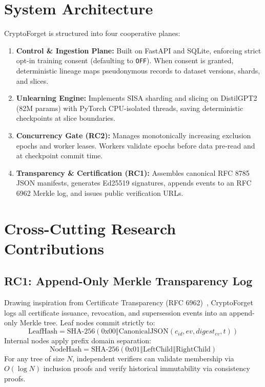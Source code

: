 \documentclass[10pt,journal,compsoc]{IEEEtran}
\begin{document}
\section{System Architecture}
CryptoForget is structured into four cooperative planes:
\begin{enumerate}
    \item \textbf{Control \& Ingestion Plane:} Built on FastAPI and SQLite, enforcing strict opt-in training consent (defaulting to \texttt{OFF}). When consent is granted, deterministic lineage maps pseudonymous records to dataset versions, shards, and slices.
    \item \textbf{Unlearning Engine:} Implements SISA sharding and slicing on DistilGPT2 (82M params) with PyTorch CPU-isolated threads, saving deterministic checkpoints at slice boundaries.
    \item \textbf{Concurrency Gate (RC2):} Manages monotonically increasing exclusion epochs and worker leases. Workers validate epochs before data pre-read and at checkpoint commit time.
    \item \textbf{Transparency \& Certification (RC1):} Assembles canonical RFC 8785 JSON manifests, generates Ed25519 signatures, appends events to an RFC 6962 Merkle log, and issues public verification URLs.
\end{enumerate}

\section{Cross-Cutting Research Contributions}

\subsection{RC1: Append-Only Merkle Transparency Log}
Drawing inspiration from Certificate Transparency (RFC 6962)~\cite{rfc6962}, CryptoForget logs all certificate issuance, revocation, and supersession events into an append-only Merkle tree. Leaf nodes commit strictly to:
\begin{equation}
\text{LeafHash} = \text{SHA-256}(0\text{x}00 \mathbin{\Vert} \text{CanonicalJSON}(c_{id}, ev, digest_{ev}, t))
\end{equation}
Internal nodes apply prefix domain separation:
\begin{equation}
\text{NodeHash} = \text{SHA-256}(0\text{x}01 \mathbin{\Vert} \text{LeftChild} \mathbin{\Vert} \text{RightChild})
\end{equation}
For any tree of size $N$, independent verifiers can validate membership via $O(\log N)$ inclusion proofs and verify historical immutability via consistency proofs.
\end{document}
